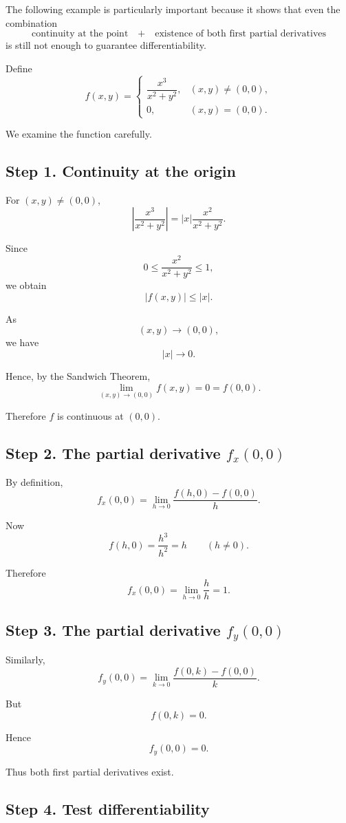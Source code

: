 \documentclass[11pt,oneside]{book}
\theoremstyle{studentthm}
\theoremstyle{definition}
\begin{document}
The following example is particularly important because it shows that
even the combination
\[
\text{continuity at the point}
\quad+\quad
\text{existence of both first partial derivatives}
\]
is still not enough to guarantee differentiability.

Define
\[
f(x,y)=
\begin{cases}
\dfrac{x^3}{x^2+y^2},&(x,y)\ne(0,0),\\[1ex]
0,&(x,y)=(0,0).
\end{cases}
\]

We examine the function carefully.

\subsection*{Step 1. Continuity at the origin}

For \((x,y)\ne(0,0)\),
\[
\left|
\frac{x^3}{x^2+y^2}
\right|
=
|x|\frac{x^2}{x^2+y^2}.
\]

Since
\[
0\le
\frac{x^2}{x^2+y^2}
\le1,
\]
we obtain
\[
|f(x,y)|\le |x|.
\]

As
\[
(x,y)\to(0,0),
\]
we have
\[
|x|\to0.
\]

Hence, by the Sandwich Theorem,
\[
\lim_{(x,y)\to(0,0)}f(x,y)=0=f(0,0).
\]

Therefore \(f\) is continuous at \((0,0)\).

\subsection*{Step 2. The partial derivative \(f_x(0,0)\)}

By definition,
\[
f_x(0,0)
=
\lim_{h\to0}
\frac{f(h,0)-f(0,0)}{h}.
\]

Now
\[
f(h,0)
=
\frac{h^3}{h^2}
=
h
\qquad(h\ne0).
\]

Therefore
\[
f_x(0,0)
=
\lim_{h\to0}\frac{h}{h}
=
1.
\]

\subsection*{Step 3. The partial derivative \(f_y(0,0)\)}

Similarly,
\[
f_y(0,0)
=
\lim_{k\to0}
\frac{f(0,k)-f(0,0)}{k}.
\]

But
\[
f(0,k)=0.
\]

Hence
\[
f_y(0,0)=0.
\]

Thus both first partial derivatives exist.

\subsection*{Step 4. Test differentiability}
\end{document}
